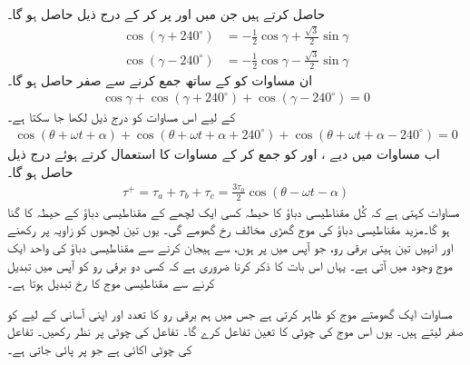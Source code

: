 حاصل کرتے ہیں جن میں   اور  پر کر کے درج ذیل حاصل ہو گا۔
\begin{align*}
\cos (\gamma+240^{\circ})&=-\frac{1}{2}\cos \gamma +\frac{\sqrt{3}}{2}\sin \gamma\\
\cos (\gamma-240^{\circ})&=-\frac{1}{2}\cos \gamma -\frac{\sqrt{3}}{2}\sin \gamma
\end{align*}
ان مساوات کو    کے ساتھ جمع کرنے سے  صفر حاصل ہو گا۔
\begin{align*}
\cos \gamma +\cos (\gamma+240^{\circ})+\cos (\gamma-240^{\circ})=0
\end{align*}
 کے لیے اس مساوات کو درج ذیل لکھا جا سکتا ہے۔
\begin{align}\label{مساوات_تبادلہ_تین_سمتیات_جمع_صفر}
\cos (\theta +\omega t +\alpha) +\cos (\theta +\omega t +\alpha+240^{\circ})+\cos (\theta+\omega t +\alpha-240^{\circ})=0
\end{align}
اب مساوات   میں دیے   ،  اور   کو جمع کر کے مساوات   کا استعمال کرتے ہوئے درج ذیل حاصل ہو گا۔
\begin{align}\label{مساوات_تبادلہ_گھومتا_موج}
\tau^+=\tau_a+\tau_b+\tau_c=\frac{3 \tau_0}{2} \cos (\theta -\omega t -\alpha)
\end{align}
مساوات  کہتی ہے کہ کُل مقناطیسی دباؤ کا حیطہ کسی ایک لچھے کے مقناطیسی دباؤ کے حیطہ کا  گنا ہو گا۔مزید مقناطیسی دباؤ کی موج گھڑی  مخالف رخ گھومے گی۔ یوں  تین لچھوں کو   زاویہ پر رکھنے اور انہیں تین ہیتی برقی رو، جو آپس میں  پر ہوں،  سے  ہیجان کرنے سے  مقناطیسی دباؤ کی واحد ایک موج وجود میں آتی ہے۔ یہاں اس بات کا ذکر کرنا ضروری ہے کہ  کسی دو برقی رو کو آپس میں تبدیل کرنے سے مقناطیسی موج کا رخ تبدیل ہوتا ہے۔  

مساوات  ایک گھومتے موج کو ظاہر کرتی ہے جس میں ہم برقی رو کا تعدد   اور اپنی آسانی کے لیے   کو صفر لیتے ہیں۔  یوں اس موج کی چوٹی کا تعین تفاعل  کرے گا۔  تفاعل  کی چوٹی پر نظر رکھیں۔ تفاعل  کی چوٹی اکائی ہے جو  پر پائی جاتی ہے۔

